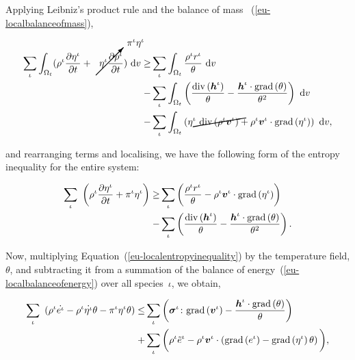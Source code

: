 \noindent Applying Leibniz's product rule and the balance of mass%
~(\ref{eu-localbalanceofmass}),

\begin{equation*}
\begin{split}
\sum\limits_{\iota} \int_{\Omega_{t}} ( \rho^{\iota} \frac{\partial
  \eta^{\iota}}{\partial t} +
\cancelto{\pi^{\iota}\eta^{\iota}}{\eta^{\iota} \frac{\partial
    \rho^{\iota}}{\partial t}}) \ \mathrm{d}v \geq &
\sum\limits_{\iota} \int_{\Omega_{t}} \frac{ \rho^{\iota}
  r^{\iota}}{\theta}\ \mathrm{d}v\\ -& \sum\limits_{\iota}
\int_{\Omega_{t}} \left(
\frac{\mathrm{div}\left(\bh^{\iota}\right)}{\theta} -
\frac{\bh^{\iota}\cdot\mathrm{grad}\left(\theta\right)}{\theta^{2}}
\right)\ \mathrm{d}v \\ - & \sum\limits_{\iota} \int_{\Omega_{t}}
\left( \cancel{\eta^{\iota}\ \mathrm{div}
  \left(\rho^{\iota}\bv^{\iota} \right)} +
\rho^{\iota}\bv^{\iota}\cdot\mathrm{grad}\left(\eta^{\iota}\right)
\right)\ \mathrm{d}v,
\end{split}
\end{equation*}

\noindent and rearranging terms and localising, we have the following
form of the entropy inequality for the entire system:

\begin{equation}
\begin{split}
\sum\limits_{\iota}\ \left( \rho^{\iota} \frac{\partial
  \eta^{\iota}}{\partial t} + \pi^{\iota}\eta^{\iota}\right) \geq &
\sum\limits_{\iota} \left( \frac{ \rho^{\iota} r^{\iota}}{\theta} -
\rho^{\iota}\mbox{\boldmath$ v$}^{\iota}\cdot\mathrm{grad}\left(\eta^{\iota}
\right)\right)\ \\ -& \sum\limits_{\iota} \left(
\frac{\mathrm{div}\left(\mbox{\boldmath$ h$}^{\iota}\right)}{\theta} -
\frac{\mbox{\boldmath$ h$}^{\iota}\cdot\mathrm{grad}\left(\theta\right)}{\theta^{2}}
\right).
\end{split}
\label{eu-localentropyinequality}
\end{equation}

Now, multiplying Equation~(\ref{eu-localentropyinequality}) by the
temperature field, $\theta$, and subtracting it from a summation of the
balance of energy~(\ref{eu-localbalanceofenergy}) over all
species~$\iota$, we obtain,

\begin{equation*}
\begin{split}
\sum\limits_{\iota}\ \left(\rho^{\iota} \dot{e^{\iota}} -
\rho^{\iota} \dot{\eta^{\iota}} \theta 
 - \pi^{\iota}\eta^{\iota}\theta \right) \leq &
\sum\limits_{\iota} \left(
\mbox{\boldmath$\sigma$}^{\iota}\colon\mathrm{grad}\left(\mbox{\boldmath$ v$}^{\iota}\right)
- \frac{\mbox{\boldmath$ h$}^{\iota}\cdot\mathrm{grad}\left(\theta\right)}{\theta}
\right)\ \\ +& \sum\limits_{\iota}\bigg( \rho^{\iota} \tilde{e}^{\iota} -
\rho^{\iota}\mbox{\boldmath$ v$}^{\iota} \cdot\left(
\mathrm{grad} \left(e^{\iota}\right) - \mathrm{grad}\left(\eta^{\iota}
\right)\theta\right)\bigg),
\end{split}
\end{equation*}

